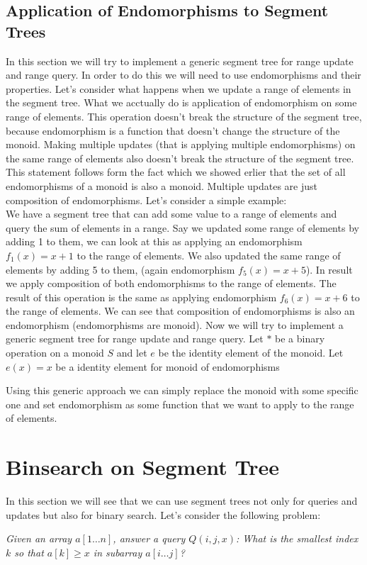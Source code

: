 \documentclass{article}
\begin{document}
\subsection{Application of Endomorphisms to Segment Trees}
In this section we will try to implement a generic segment tree for range update and range query.
In order to do this we will need to use endomorphisms and their properties.
Let's consider what happens when we update a range of elements in the segment tree.
What we acctually do is application of endomorphism on some range of elements. This operation
doesn't break the structure of the segment tree, because endomorphism is a function that doesn't change the structure of the monoid.
Making multiple updates (that is applying multiple endomorphisms) on the same range of elements 
also doesn't break the structure of the segment tree.
This statement follows form the fact which we showed erlier that the set of all endomorphisms of a monoid is also a monoid.
Multiple updates are just composition of endomorphisms.
Let's consider a simple example: \\
We have a segment tree that can add some value to a range of elements and query the sum of elements in a range.
Say we updated some range of elements by adding 1 to them,
we can look at this as applying an endomorphism \(f_1(x) = x + 1\) to the range of elements.
We also updated the same range of elements by adding 5 to them, (again endomorphism \(f_5(x) = x + 5\)).
In result we apply composition of both endomorphisms to the range of elements.
The result of this operation is the same as applying endomorphism \(f_6(x) = x + 6\) to the range of elements.
We can see that composition of endomorphisms is also an endomorphism (endomorphisms are monoid).
Now we will try to implement a generic segment tree for range update and range query.
Let \(\ast\) be a binary operation on a monoid \(S\) and let \(e\) be the identity element of the monoid.
Let \(e(x) = x\) be a identity element for monoid of endomorphisms

\vspace{0.1cm}
\FloatBarrier
Using this generic approach we can simply replace the monoid with some specific one and
set endomorphism as some function that we want to apply to the range of elements.

\section{Binsearch on Segment Tree}
In this section we will see that we can use segment trees not only for queries and updates but also for
binary search. Let's consider the following problem:
\begin{center}
    \textit{Given an array $a[1 \ldots n]$, answer a query $Q(i, j, x)$: What is the smallest index $k$ so that $a[k] \geq x$ in subarray  $a[i \ldots j]$?}\\[1ex]
\end{center}
\end{document}
